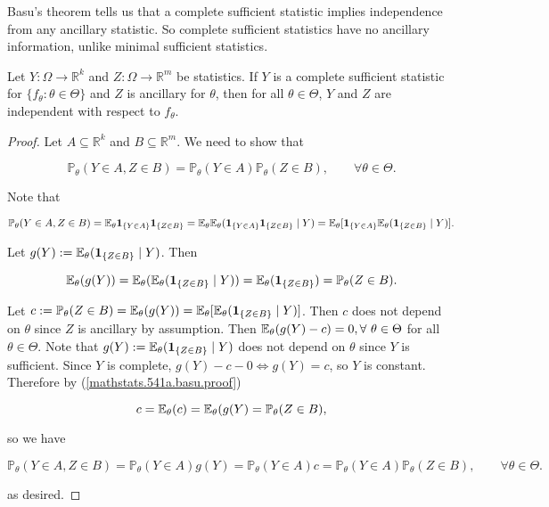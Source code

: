 Basu's theorem tells us that a complete sufficient statistic implies independence from any ancillary statistic. So complete sufficient statistics have no ancillary information, unlike minimal sufficient statistics.

\begin{theorem}\label{mathstats.thm.basu} Let \(Y: \Omega \to \mathbb{R}^k\) and \(Z: \Omega \to \mathbb{R}^m\) be statistics. If \(Y\) is a complete sufficient statistic for \(\{f_\theta: \theta \in \Theta\}\) and \(Z\) is ancillary for \(\theta\), then for all \(\theta \in \Theta\), \(Y\) and \(Z\) are independent with respect to \(f_\theta\).

\end{theorem}

\begin{proof} Let \(A \subseteq \mathbb{R}^k\) and \(B \subseteq \mathbb{R}^m\). We need to show that 

\[
\mathbb{P}_\theta (Y \in A, Z \in B) = \mathbb{P}_\theta (Y \in A) \mathbb{P}_\theta (Z \in B), \qquad \forall \theta \in \Theta.
\]

Note that

\[
\mathbb{P}_\theta (Y \in A, Z \in B) = \E_\theta \boldsymbol{1}_{\{Y \in A \}} \boldsymbol{1}_{\{Z \in B\}} =  \E_\theta  \E_\theta(\boldsymbol{1}_{\{Y \in A \}} \boldsymbol{1}_{\{Z \in B\}}  \mid Y) = \E_\theta [  \boldsymbol{1}_{\{Y \in A \}}\E_\theta( \boldsymbol{1}_{\{Z \in B\}}  \mid Y) ].
\]

Let \(g(Y) := \E_\theta( \boldsymbol{1}_{\{Z \in B\}} \mid Y ) \). Then

 \begin{equation}\label{mathstats.541a.basu.proof}
\E_\theta (g(Y)) = \E_\theta (\E_\theta( \boldsymbol{1}_{\{Z \in B\}} \mid Y)) = \E_\theta( \boldsymbol{1}_{\{Z \in B\}}) = \mathbb{P}_\theta ( Z \in B).
\end{equation}

Let \(c:= \mathbb{P}_\theta ( Z \in B) = \E_\theta (g(Y))  = \E_\theta [\E_\theta( \boldsymbol{1}_{\{Z \in B\}} \mid Y )] \). Then \(c\) does not depend on \(\theta\) since \(Z\) is ancillary by assumption. Then \(\E_\theta(g(Y) - c) = 0, \forall \ \theta \in \Theta\) for all \(\theta \in \Theta\). Note that  \(g(Y) := \E_\theta( \boldsymbol{1}_{\{Z \in B\}} \mid Y) \) does not depend on \(\theta\) since \(Y\) is sufficient. Since \(Y\) is complete, \(g(Y) - c - 0 \iff g(Y) = c\), so \(Y\) is constant. Therefore by (\ref{mathstats.541a.basu.proof})

\[
c = \E_\theta(c) = \E_\theta(g(Y) = \mathbb{P}_\theta ( Z \in B),
\]

so we have

\[
\mathbb{P}_\theta (Y \in A, Z \in B) = \mathbb{P}_\theta (Y \in A)g(Y) = \mathbb{P}_\theta (Y \in A)c  = \mathbb{P}_\theta (Y \in A)\mathbb{P}_\theta ( Z \in B)  , \qquad \forall \theta \in \Theta.
\]

as desired.

\end{proof}


